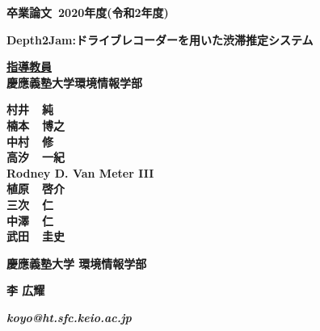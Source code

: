 \pagestyle{empty}

\begin{center}

\vspace{5cm}

\textbf{\Large 卒業論文~2020年度(令和2年度)}

\vspace{2cm}

\textbf{\LARGE Depth2Jam:ドライブレコーダーを用いた渋滞推定システム}

\vspace{3cm}

\textbf{\underline{\large 指導教員}}\\
\textbf{慶應義塾大学環境情報学部}

\textbf{\Large 村井~~純}\\
\textbf{\Large 楠本~~博之}\\
\textbf{\Large 中村~~修}\\
\textbf{\Large 高汐~~一紀}\\
\textbf{\Large Rodney D. Van Meter III}\\
\textbf{\Large 植原~~啓介}\\
\textbf{\Large 三次~~仁}\\
\textbf{\Large 中澤~~仁}\\
\textbf{\Large 武田~~圭史}\\

\vspace{6cm}

\textbf{\LARGE 慶應義塾大学 環境情報学部}

\vspace{.5em}

\textbf{\LARGE 李 広耀}

\vspace{.3em}

\textbf{\it koyo@ht.sfc.keio.ac.jp}

\newpage

\end{center}

\pagestyle{plain}
